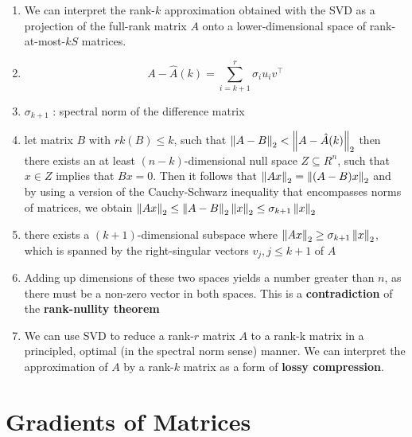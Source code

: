 \begin{enumerate}
    \item We can interpret the rank-$k$ approximation obtained with the SVD as a projection of the full-rank matrix $A$ onto a lower-dimensional space of rank-at-most-$kS$ matrices.

    \item \[
        \displaystyle
        A - \hat{A}(k) = 
        \sum_{i=k+1}^{r} \sigma_iu_iv^\top
    \]

    \item $\sigma_{k+1}$ : spectral norm of the difference matrix

    \item let matrix $B$ with $rk(B) \leq k$, such that $\left\| A-B \right\|_2 < \left\| A-\hat{A}(k) \right\|_2$ then there exists an at least $(n - k)$-dimensional null space $Z \subseteq R^n$, such that $x \in Z$ implies that $Bx = 0$. Then it follows that $\left\| Ax \right\|_2=\left\| (A-B)x \right\|_2$ and by using a version of the Cauchy-Schwarz inequality  that encompasses norms of matrices, we obtain $\left\| Ax \right\|_2 \leq \left\| A-B \right\|_2\left\| x \right\|_2 \leq \sigma_{k+1}\left\| x \right\|_2$

    \item there exists a $(k + 1)$-dimensional subspace where $\left\| Ax \right\|_2 \geq \sigma _{k+1}\left\| x \right\|_2$, which is spanned by the right-singular vectors $v_j, j \leq k + 1$ of $A$

    \item Adding up dimensions of these two spaces yields a number greater than $n$, as there must be a non-zero vector in both spaces. This is a \textbf{contradiction} of the \textbf{rank-nullity theorem}

    \item We can use SVD to reduce a rank-$r$ matrix $A$ to a rank-k matrix  in a principled, optimal (in the spectral norm sense) manner. We can interpret the approximation of $A$ by a rank-$k$ matrix as a form of \textbf{lossy compression}.

\end{enumerate}



\section{Gradients of Matrices}

